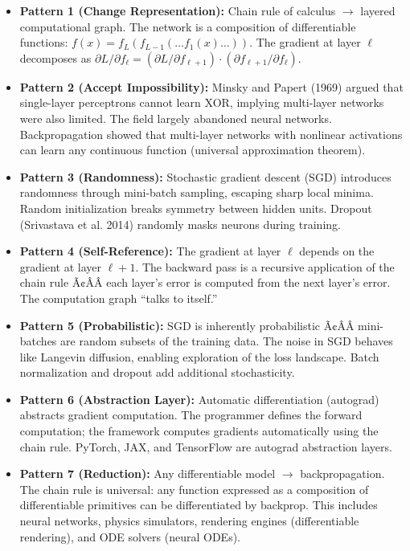\begin{itemize}
\item \textbf{Pattern 1 (Change Representation):} Chain rule of calculus $\to$ layered computational graph. The network is a composition of differentiable functions: $f(x) = f_L(f_{L-1}(\dots f_1(x)\dots))$. The gradient at layer $\ell$ decomposes as $\partial L/\partial f_\ell = (\partial L/\partial f_{\ell+1}) \cdot (\partial f_{\ell+1}/\partial f_\ell)$.

\item \textbf{Pattern 2 (Accept Impossibility):} Minsky and Papert (1969) argued that single-layer perceptrons cannot learn XOR, implying multi-layer networks were also limited. The field largely abandoned neural networks. Backpropagation showed that multi-layer networks with nonlinear activations can learn any continuous function (universal approximation theorem).

\item \textbf{Pattern 3 (Randomness):} Stochastic gradient descent (SGD) introduces randomness through mini-batch sampling, escaping sharp local minima. Random initialization breaks symmetry between hidden units. Dropout (Srivastava et al. 2014) randomly masks neurons during training.

\item \textbf{Pattern 4 (Self-Reference):} The gradient at layer $\ell$ depends on the gradient at layer $\ell+1$. The backward pass is a recursive application of the chain rule Ã¢ÂÂ each layer's error is computed from the next layer's error. The computation graph ``talks to itself.''

\item \textbf{Pattern 5 (Probabilistic):} SGD is inherently probabilistic Ã¢ÂÂ mini-batches are random subsets of the training data. The noise in SGD behaves like Langevin diffusion, enabling exploration of the loss landscape. Batch normalization and dropout add additional stochasticity.

\item \textbf{Pattern 6 (Abstraction Layer):} Automatic differentiation (autograd) abstracts gradient computation. The programmer defines the forward computation; the framework computes gradients automatically using the chain rule. PyTorch, JAX, and TensorFlow are autograd abstraction layers.

\item \textbf{Pattern 7 (Reduction):} Any differentiable model $\to$ backpropagation. The chain rule is universal: any function expressed as a composition of differentiable primitives can be differentiated by backprop. This includes neural networks, physics simulators, rendering engines (differentiable rendering), and ODE solvers (neural ODEs).


\end{itemize}
